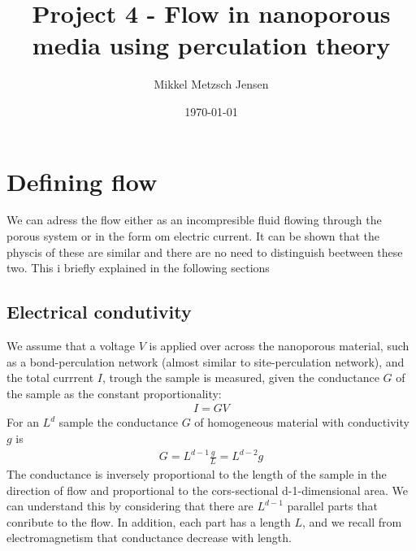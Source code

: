 \documentclass[reprint, amsmath, amssymb, aps]{revtex4-2}
\begin{document}
\title{Project 4 - Flow in nanoporous media using perculation theory}
\author{Mikkel Metzsch Jensen}

\date{\today}
\maketitle
\section{Defining flow}
We can adress the flow either as an incompresible fluid flowing through the porous system or in the form om electric current. It can be shown that the physcis of these are similar and there are no need to distinguish beetween these two. This i briefly explained in the following sections

\subsection{Electrical condutivity}
We assume that a voltage $V$ is applied over across the nanoporous material, such as a bond-perculation network (almost similar to site-perculation network), and the total currrent $I$, trough the sample is measured, given the conductance $G$ of the sample as the constant proportionality:
\begin{align*}
  I = GV
\end{align*}
For an $L^d$ sample the conductance $G$ of homogeneous material with conductivity $g$ is
\begin{align}
  G = L^{d-1} \frac{g}{L} = L^{d-2}g
  \label{eq:G_electric}
\end{align}
The conductance is inversely proportional to the length of the sample in the direction of flow and proportional to the cors-sectional d-1-dimensional area. We can understand this by considering that there are $L^{d-1}$ parallel parts that conribute to the flow. In addition, each part has a length $L$, and we recall from electromagnetism that conductance decrease with length.
\end{document}
